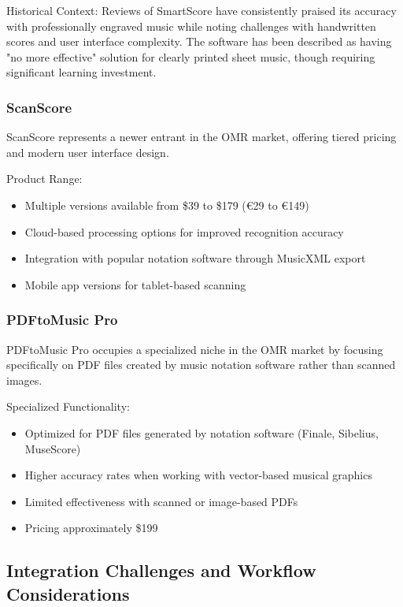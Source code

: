 Historical Context:
Reviews of SmartScore have consistently praised its accuracy with professionally engraved music while noting challenges with handwritten scores and user interface complexity. The software has been described as having "no more effective" solution for clearly printed sheet music, though requiring significant learning investment.

\subsubsection{ScanScore}
ScanScore represents a newer entrant in the OMR market, offering tiered pricing and modern user interface design.

Product Range:
\begin{itemize}
    \item Multiple versions available from \$39 to \$179 (€29 to €149)
    \item Cloud-based processing options for improved recognition accuracy
    \item Integration with popular notation software through MusicXML export
    \item Mobile app versions for tablet-based scanning
\end{itemize}

\subsubsection{PDFtoMusic Pro}
PDFtoMusic Pro occupies a specialized niche in the OMR market by focusing specifically on PDF files created by music notation software rather than scanned images.

Specialized Functionality:
\begin{itemize}
    \item Optimized for PDF files generated by notation software (Finale, Sibelius, MuseScore)
    \item Higher accuracy rates when working with vector-based musical graphics
    \item Limited effectiveness with scanned or image-based PDFs
    \item Pricing approximately \$199
\end{itemize}

\subsection{Integration Challenges and Workflow Considerations}

